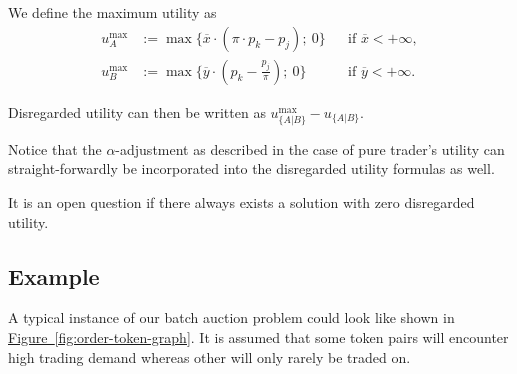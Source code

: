 \documentclass[11pt,parskip=full]{scrartcl}%
\newcommand*{\figref}[1]{\hyperref[{#1}]{Figure~\ref*{#1}}}
\begin{document}
We define the maximum utility as
\begin{subequations}
\begin{align}
  u_A^{\max} &:= \max\{\overline{x} \cdot (\pi \cdot p_k - p_j); \> 0\}
  &&\text{if }\overline{x} < +\infty
  \label{eq:utility_a_max},\\[3mm]
  u_B^{\max} &:= \max\{\overline{y} \cdot (p_k - \frac{p_j}{\pi}); \> 0\}
  &&\text{if }\overline{y} < +\infty
  \label{eq:utility_b_max}.
\end{align}
\label{eq:utility_adjusted}
\end{subequations}

Disregarded utility can then be written as $u_{\{A|B\}}^{\max} - u_{\{A|B\}}$.

Notice that the $\alpha$-adjustment as described in the case of pure trader's utility can straight-forwardly be incorporated into the disregarded utility formulas as well.

It is an open question if there always exists a solution with zero disregarded utility.

\begin{comment}
\paragraph{Properties}

Here is a list of research questions that we would like to answer.

\begin{itemize}
  \item In an optimal solution, is it guaranteed that orders can always be fully executed if their
  limit prices are strictly higher (buy order) or lower (sell order) than the exchange rate between
  the respective token pair?
  If true, we would only need to resort to partially executing orders if the execution price is
  equal to the limit price.
  \item What is the impact of optimizing the trading volume vs. the traders' welfare?
\end{itemize}
\end{comment}

\newpage
\subsection{Example}

A typical instance of our batch auction problem could look like shown in 
\figref{fig:order-token-graph}.
It is assumed that some token pairs will encounter high trading demand whereas other will only
rarely be traded on.
\end{document}
